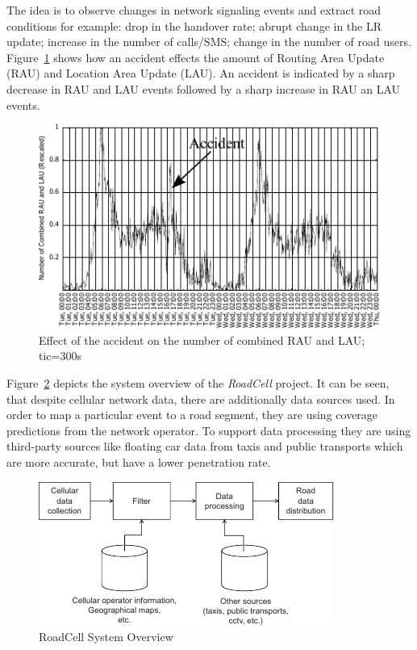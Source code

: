 The idea is to observe changes in network signaling events and extract road conditions for example: drop in the handover rate; abrupt change in the LR update; increase in the number of calls/SMS; change in the number of road users. Figure~\ref{fig:raodcell_accident} shows how an accident effects the amount of Routing Area Update (RAU) and Location Area Update (LAU). An accident is indicated by a sharp decrease in RAU and LAU events followed by a sharp increase in RAU an LAU events.
\begin{figure}
\centering
\includegraphics[width=0.7\linewidth]{./images/raodcell_accident}
\caption{Effect of the accident on the number of combined RAU and LAU; tic=300s \cite{Valerio20092}}
\label{fig:raodcell_accident}
\end{figure}

Figure~\ref{fig:roadcell} depicts the system overview of the \emph{RoadCell} project. It can be seen, that despite cellular network data, there are additionally data sources used. In order to map a particular event to a road segment, they are using coverage predictions from the network operator. To support data processing they are using third-party sources like floating car data from taxis and public transports which are more accurate, but have a lower penetration rate.
\begin{figure}
\centering
\includegraphics[width=0.7\linewidth]{./images/roadcell}
\caption{RoadCell System Overview \cite{Valerio2009}}
\label{fig:roadcell}
\end{figure}

